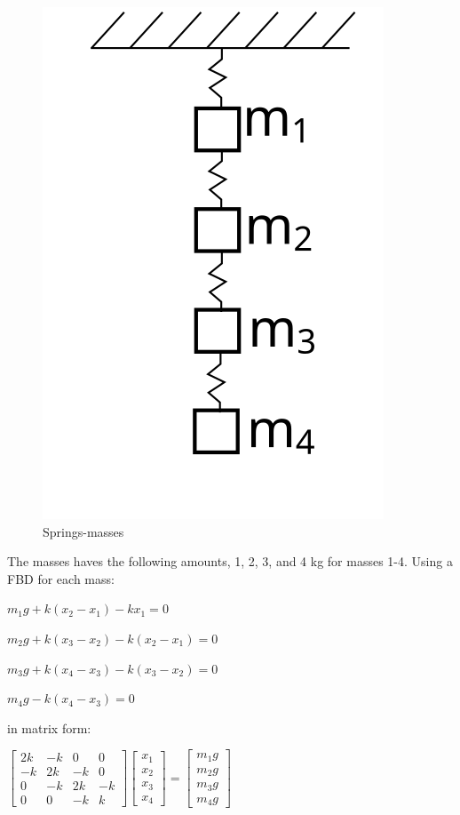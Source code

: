 \documentclass[11pt]{article}
\makeatletter
\def\maxwidth{\ifdim\Gin@nat@width>\linewidth\linewidth
    \else\Gin@nat@width\fi}
\let\Oldincludegraphics\includegraphics
\renewcommand{\includegraphics}[1]{\Oldincludegraphics[width=.8\maxwidth]{#1}}
\makeatother
\begin{document}
\begin{figure}[htbp]
\centering
\includegraphics{../lecture_09/mass_springs.svg}
\caption{Springs-masses}
\end{figure}

The masses haves the following amounts, 1, 2, 3, and 4 kg for masses
1-4. Using a FBD for each mass:

\(m_{1}g+k(x_{2}-x_{1})-kx_{1}=0\)

\(m_{2}g+k(x_{3}-x_{2})-k(x_{2}-x_{1})=0\)

\(m_{3}g+k(x_{4}-x_{3})-k(x_{3}-x_{2})=0\)

\(m_{4}g-k(x_{4}-x_{3})=0\)

in matrix form:

\(\left[ \begin{array}{cccc} 2k & -k & 0 & 0 \\ -k & 2k & -k & 0 \\ 0 & -k & 2k & -k \\ 0 & 0 & -k & k \end{array} \right] \left[ \begin{array}{c} x_{1} \\ x_{2} \\ x_{3} \\ x_{4} \end{array} \right]= \left[ \begin{array}{c} m_{1}g \\ m_{2}g \\ m_{3}g \\ m_{4}g \end{array} \right]\)
\end{document}
